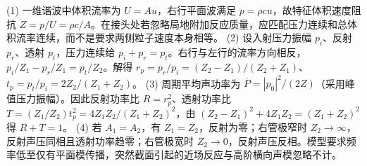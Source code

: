(1) 一维谐波中体积流率为 \(U=A u\)，右行平面波满足 \(p=\rho c u\)，故特征体积速度阻抗 \(Z=p/U=\rho c/A\)。在接头处若忽略局地附加反应质量，应匹配压力连续和总体积流率连续，而不是要求两侧粒子速度本身相等。
(2) 设入射压力振幅 \(p_i\)、反射 \(p_r\)、透射 \(p_t\)，压力连续给 \(p_i+p_r=p_t\)。右行与左行的流率方向相反，\(p_i/Z_1-p_r/Z_1=p_t/Z_2\)。解得 \(r_p=p_r/p_i=(Z_2-Z_1)/(Z_2+Z_1)\)、\(t_p=p_t/p_i=2Z_2/(Z_1+Z_2)\)。
(3) 周期平均声功率为 \(\overline P=|p_0|^2/(2Z)\)（采用峰值压力振幅）。因此反射功率比 \(R=r_p^2\)、透射功率比 \(T=(Z_1/Z_2)t_p^2=4Z_1Z_2/(Z_1+Z_2)^2\)，由 \((Z_2-Z_1)^2+4Z_1Z_2=(Z_1+Z_2)^2\) 得 \(R+T=1\)。
(4) 若 \(A_1=A_2\)，有 \(Z_1=Z_2\)，反射为零；右管极窄时 \(Z_2\to\infty\)，反射声压同相且透射功率趋零；右管极宽时 \(Z_2\to0\)，反射声压反相。模型要求频率低至仅有平面模传播，突然截面引起的近场反应与高阶横向声模忽略不计。
